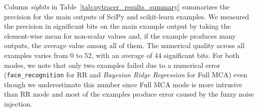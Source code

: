 \documentclass[11pt]{article}
\newcommand{\tristan}[1]{\color{orange}\textbf{From Tristan:} #1\color{black}\xspace}
\begin{document}
Column \textit{sigbits} in Table~\ref{tab:pytracer_results_summary} summarizes the precision for the main outputs of SciPy and scikit-learn examples. 
We measured the precision in significant bits on the main example output by taking the element-wise mean for non-scalar values and, if the example produces many outputs, the average value among all of them. The numerical quality across all examples varies from 0 to 52, with an average of 44 significant bits. For both modes, we note that only two examples failed due to a numerical error 
(\texttt{face\_recognition} for RR and \textit{Bayesian Ridge Regression} for Full MCA) even though we underestimate this number since Full MCA mode is more intrusive than RR mode and most of the examples produce error caused by the fuzzy noise injection. 
\end{document}
